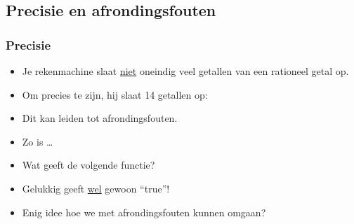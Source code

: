 \subsection{Precisie en afrondingsfouten}

\begin{frame}
\frametitle{Precisie}

\begin{itemize}
  \item<1-> Je rekenmachine slaat \underline{niet} oneindig veel getallen van een rationeel getal op.
  \item<2-> Om precies te zijn, hij slaat 14 getallen op:
\end{itemize}
\begin{itemize}
  \item<3-> Dit kan leiden tot afrondingsfouten.
  \item<4-> Zo is \ldots
  \item<5-> Wat geeft de volgende functie? 
\end{itemize}

\begin{itemize}
  \item<7-> Gelukkig geeft  \underline{wel} gewoon ``true''!
  \item<8-> Enig idee hoe we met afrondingsfouten kunnen omgaan?
\end{itemize}

\end{frame}



